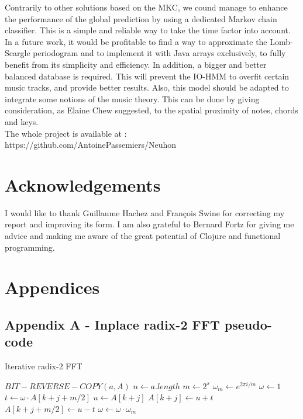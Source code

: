 \documentclass[letterpaper]{article}
\begin{document}
Contrarily to other solutions based on the MKC, we cound manage to enhance the performance of the global prediction by using a dedicated Markov chain classifier. This is a simple and reliable way to take the time factor into account.\\

In a future work, it would be profitable to find a way to approximate the Lomb-Scargle periodogram and to implement it with Java arrays exclusively, to fully benefit from its simplicity and efficiency. In addition, a bigger and better balanced database is required. This will prevent the IO-HMM to overfit certain music tracks, and provide better results. Also, this model should be adapted to integrate some notions of the music theory. This can be done by giving consideration, as Elaine Chew suggested, to the spatial proximity of notes, chords and keys.\\

The whole project is available at : https://github.com/AntoinePassemiers/Neuhon

\section*{Acknowledgements}
I would like to thank Guillaume Hachez and François Swine for correcting my report and improving its form. I am also grateful to Bernard Fortz for giving me advice and making me aware of the great potential of Clojure and functional programming.

\footnotesize



\newpage

\section{Appendices}

\subsection{Appendix A - Inplace radix-2 FFT pseudo-code}

\begin{algorithm}
\caption{Iterative radix-2 FFT}\label{fft}
\begin{algorithmic}[1]
\State $BIT-REVERSE-COPY(a, A)$
\State $n \gets a.length$
	\State $m \gets 2^{s}$
	\State $\omega_m \gets e^{2\pi i / m} $
		\State $\omega \gets 1$
			\State $t \gets \omega \cdot A[k + j + m/2]$
			\State $u \gets A[k + j]$
			\State $A[k + j] \gets u + t$
			\State $A[k + j + m/2] \gets u - t$
			\State $\omega \gets \omega \cdot \omega_m$
		\EndFor
	\EndFor
\EndFor
\EndProcedure
\end{algorithmic}
\end{algorithm}
\end{document}
